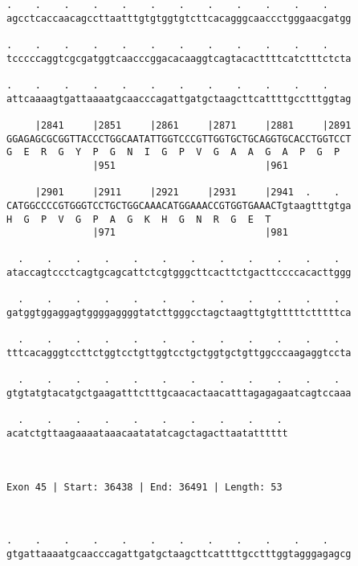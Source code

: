 \documentclass{article}
\begin{document}
\begin{Verbatim}
.    .    .    .    .    .    .    .    .    .    .    .    
agcctcaccaacagccttaatttgtgtggtgtcttcacagggcaaccctgggaacgatgg
                                                            
.    .    .    .    .    .    .    .    .    .    .    .    
tcccccaggtcgcgatggtcaacccggacacaaggtcagtacacttttcatctttctcta
                                                            
.    .    .    .    .    .    .    .    .    .    .    .    
attcaaaagtgattaaaatgcaacccagattgatgctaagcttcattttgcctttggtag
                                                            
     |2841     |2851     |2861     |2871     |2881     |2891
GGAGAGCGCGGTTACCCTGGCAATATTGGTCCCGTTGGTGCTGCAGGTGCACCTGGTCCT
G  E  R  G  Y  P  G  N  I  G  P  V  G  A  A  G  A  P  G  P  
               |951                          |961           
  
     |2901     |2911     |2921     |2931     |2941  .    .  
CATGGCCCCGTGGGTCCTGCTGGCAAACATGGAAACCGTGGTGAAACTgtaagtttgtga
H  G  P  V  G  P  A  G  K  H  G  N  R  G  E  T              
               |971                          |981           
  
  .    .    .    .    .    .    .    .    .    .    .    .  
ataccagtccctcagtgcagcattctcgtgggcttcacttctgacttccccacacttggg
                                                            
  .    .    .    .    .    .    .    .    .    .    .    .  
gatggtggaggagtggggaggggtatcttgggcctagctaagttgtgtttttctttttca
                                                            
  .    .    .    .    .    .    .    .    .    .    .    .  
tttcacagggtccttctggtcctgttggtcctgctggtgctgttggcccaagaggtccta
                                                            
  .    .    .    .    .    .    .    .    .    .    .    .  
gtgtatgtacatgctgaagatttctttgcaacactaacatttagagagaatcagtccaaa
                                                            
  .    .    .    .    .    .    .    .    .    . 
acatctgttaagaaaataaacaatatatcagctagacttaatatttttt
                                                 
                                                 
 
Exon 45 | Start: 36438 | End: 36491 | Length: 53



.    .    .    .    .    .    .    .    .    .    .    .    
gtgattaaaatgcaacccagattgatgctaagcttcattttgcctttggtagggagagcg
                                                            

\end{Verbatim}
\end{document}
